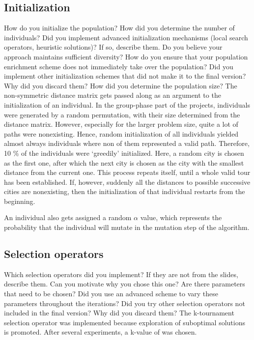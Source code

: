\documentclass[a4paper,10pt]{article}
\newcommand{\ReplaceMe}[1]{{\color{blue}#1}}
\begin{document}
\subsection{Initialization}
\label{initialization}
\ReplaceMe{How do you initialize the population? How did you determine the number of individuals? Did you implement advanced initialization mechanisms (local search operators, heuristic solutions)? If so, describe them. Do you believe your approach maintains sufficient diversity? How do you ensure that your population enrichment scheme does not immediately take over the population? Did you implement other initialization schemes that did not make it to the final version? Why did you discard them? How did you determine the population size?}
The non-symmetric distance matrix gets passed along as an argument to the initialization of an individual. In the group-phase part of the projects, individuals were generated by a random permutation, with their size determined from the distance matrix. However, especially for the larger problem size, quite a lot of paths were nonexisting. Hence, random initialization of all individuals yielded almost always individuals where non of them represented a valid path. Therefore, 10 \% %
of the individuals were `greedily' initialized. Here, a random city is chosen as the first one, after which the next city is chosen as the city with the smallest distance from the current one. This process repeats itself, until a whole valid tour has been established. If, however, suddenly all the distances to possible successive cities are nonexisting, then the initialization of that individual restarts from the beginning.


An individual also gets assigned a random $\alpha$ value, which represents the probability that the individual will mutate in the mutation step of the algorithm.

\subsection{Selection operators}
\label{selection}
\ReplaceMe{Which selection operators did you implement? If they are not from the slides, describe them. Can you motivate why you chose this one? Are there parameters that need to be chosen? Did you use an advanced scheme to vary these parameters throughout the iterations? Did you try other selection operators not included in the final version? Why did you discard them?}
The k-tournament selection operator was implemented because exploration of suboptimal solutions is promoted. After several experiments, a k-value of %
was chosen.
\end{document}
